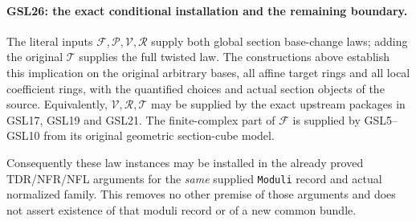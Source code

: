 \documentclass[11pt,a4paper]{article}
\numberwithin{equation}{section}
\theoremstyle{remark}\newtheorem{remark}[theorem]{Remark}
\begin{document}
\paragraph{GSL26: the exact conditional installation and the remaining boundary.}
\label{claim:GSL26}
The literal inputs $\mathcal F,\mathcal P,\mathcal V,\mathcal R$
supply both global section base-change laws; adding the original
$\mathcal T$ supplies the full twisted law.  The constructions
above establish this implication on the original arbitrary bases,
all affine target rings and all local coefficient rings, with
the quantified choices and actual section objects of the source.
Equivalently, $\mathcal V,\mathcal R,\mathcal T$ may be supplied
by the exact upstream packages in GSL17, GSL19 and GSL21.
The finite-complex part of $\mathcal F$ is supplied by
GSL5--GSL10 from its original geometric section-cube model.

Consequently these law instances may be installed in the already
proved TDR/NFR/NFL arguments for the \emph{same} supplied
\texttt{Moduli} record and actual normalized family.
This removes no other premise of those arguments and does not
assert existence of that moduli record or of a new common bundle.
\end{document}
